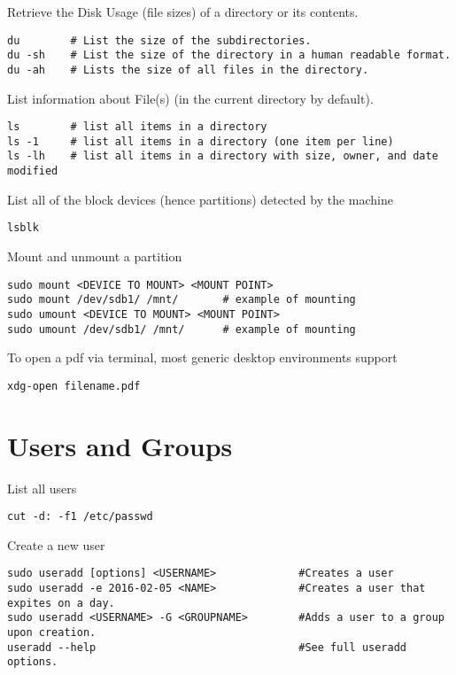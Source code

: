 Retrieve the Disk Usage (file sizes) of a directory or its contents.
\begin{lstlisting}
du        # List the size of the subdirectories.
du -sh    # List the size of the directory in a human readable format.
du -ah    # Lists the size of all files in the directory.
\end{lstlisting}

List information about File(s) (in the current directory by default).
\begin{lstlisting}
ls        # list all items in a directory
ls -1     # list all items in a directory (one item per line)
ls -lh    # list all items in a directory with size, owner, and date modified
\end{lstlisting}

List all of the block devices (hence partitions) detected by the machine
\begin{lstlisting}
lsblk
\end{lstlisting}

Mount and unmount a partition
\begin{lstlisting}
sudo mount <DEVICE TO MOUNT> <MOUNT POINT>
sudo mount /dev/sdb1/ /mnt/       # example of mounting
sudo umount <DEVICE TO MOUNT> <MOUNT POINT>
sudo umount /dev/sdb1/ /mnt/      # example of mounting
\end{lstlisting}


To open a pdf via terminal, most generic desktop environments support
\begin{lstlisting}
xdg-open filename.pdf
\end{lstlisting}





\section{Users and Groups}

List all users
\begin{lstlisting}
cut -d: -f1 /etc/passwd
\end{lstlisting}

Create a new user
\begin{lstlisting}
sudo useradd [options] <USERNAME>             #Creates a user
sudo useradd -e 2016-02-05 <NAME>             #Creates a user that expites on a day.
sudo useradd <USERNAME> -G <GROUPNAME>        #Adds a user to a group upon creation.
useradd --help                                #See full useradd options.
\end{lstlisting}

